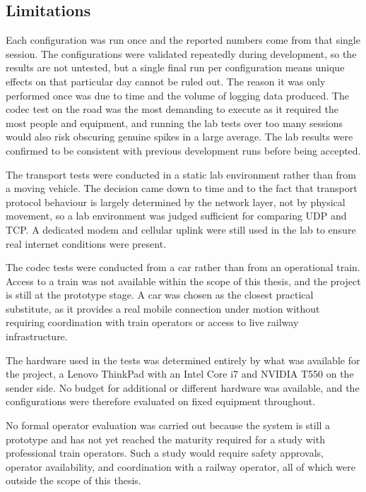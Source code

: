 \subsection{Limitations}

Each configuration was run once and the reported numbers come from that single session. The configurations were validated repeatedly during development, so the results are not untested, but a single final run per configuration means unique effects on that particular day cannot be ruled out. The reason it was only performed once was due to time and the volume of logging data produced. The codec test on the road was the most demanding to execute as it required the most people and equipment, and running the lab tests over too many sessions would also risk obscuring genuine spikes in a large average. The lab results were confirmed to be consistent with previous development runs before being accepted.

The transport tests were conducted in a static lab environment rather than from a moving vehicle. The decision came down to time and to the fact that transport protocol behaviour is largely determined by the network layer, not by physical movement, so a lab environment was judged sufficient for comparing UDP and TCP. A dedicated modem and cellular uplink were still used in the lab to ensure real internet conditions were present.

The codec tests were conducted from a car rather than from an operational train. Access to a train was not available within the scope of this thesis, and the project is still at the prototype stage. A car was chosen as the closest practical substitute, as it provides a real mobile connection under motion without requiring coordination with train operators or access to live railway infrastructure.

The hardware used in the tests was determined entirely by what was available for the project, a Lenovo ThinkPad with an Intel Core i7 and NVIDIA T550 on the sender side. No budget for additional or different hardware was available, and the configurations were therefore evaluated on fixed equipment throughout.

No formal operator evaluation was carried out because the system is still a prototype and has not yet reached the maturity required for a study with professional train operators. Such a study would require safety approvals, operator availability, and coordination with a railway operator, all of which were outside the scope of this thesis.

